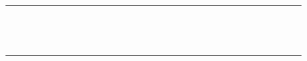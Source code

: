 \begin{tabular}{rhchchchchchchchchchchchchc}
\addlinespace[2pt]
\cite{SGKA:ESECFSE15}&&&&&&&&&&&&&&&&&&&&&&&&&&\\
\cite{SKK+:ICSE12}&&&&&&&&&&&&&&&&&&&&&&&&&&\\
\cite{SRK+:IST13}&&&&&&&&&&&&&&&&&&&&&&&&&&\\
\cite{SRK+:SQJ12}&&&&&&&&&&&&&&&&&&&&&&&&&&\\
\cite{SRA:GPCE13}&&&&&&&&&&&&&&&&&&&&&&&&&&\\
\addlinespace[2pt]
\cite{TDS+:ATC14}&&&&&&&&&&&&&&&&&&&&&&&&&&\\
\cite{TDS+:ATC14}&&&&&&&&&&&&&&&&&&&&&&&&&&\\
\cite{TLD:OSR12}&&&&&&&&&&&&&&&&&&&&&&&&&&\\
\cite{TLD:OSR12}&&&&&&&&&&&&&&&&&&&&&&&&&&\\
\cite{KMKB:ESECFSE13}&&&&&&&&&&&&&&&&&&&&&&&&&&\\
\addlinespace[2pt]
\cite{CDS:TSE08}&&&&&&&&&&&&&&&&&&&&&&&&&&\\
\cite{SRKKS:APSEC08}&&&&&&&&&&&&&&&&&&&&&&&&&&\\
\bottomrule
\end{tabular}

